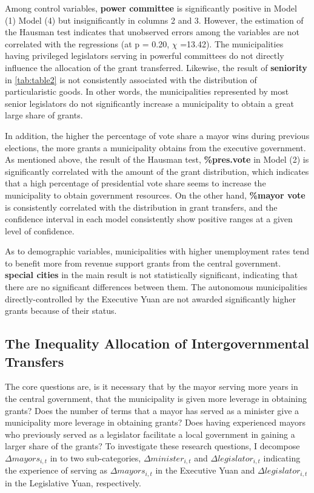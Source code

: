 

Among control variables, \textbf{power committee} is significantly positive in Model (1) Model (4) but insignificantly in columns 2 and 3. However, the estimation of the Hausman test indicates that unobserved errors among the variables are not correlated with the regressions (at p = 0.20, $\chi$ =13.42). The municipalities having privileged legislators serving in powerful committees do not directly influence the allocation of the grant transferred. Likewise, the result of \textbf{seniority} in \autoref{tab:table2} is not consistently associated with the distribution of particularistic goods. In other words, the municipalities represented by most senior legislators do not significantly increase a municipality to obtain a great large share of grants.

In addition, the higher the percentage of vote share a mayor wins during previous elections, the more grants a municipality obtains from the executive government. As mentioned above, the result of the Hausman test, \textbf{\%pres.vote} in Model (2) is significantly correlated with the amount of the grant distribution, which indicates that a high percentage of presidential vote share seems to increase the municipality to obtain government resources. On the other hand, \textbf{\%mayor vote} is consistently correlated with the distribution in grant transfers, and the confidence interval in each model consistently show positive ranges at a given level of confidence.

As to demographic variables, municipalities with higher unemployment rates tend to benefit more from revenue support grants from the central government. \textbf{special cities} in the main result is not statistically significant, indicating that there are no significant differences between them. The autonomous municipalities directly-controlled by the Executive Yuan are not awarded significantly higher grants because of their status. 

\subsection*{The Inequality Allocation of Intergovernmental Transfers}

The core questions are, is it necessary that by the mayor serving more years  in the central government, that the municipality is given more leverage in obtaining grants? Does the number of terms that a mayor has served as a minister give a municipality more leverage in obtaining grants? Does having experienced mayors who previously served as a legislator facilitate a local government in gaining a larger share of the grants? To investigate these research questions, I decompose $\Delta mayors_{i,t}$ in to two sub-categories, $\Delta minister_{i,t}$ and $\Delta legislator_{i,t}$ indicating the experience of serving as $\Delta mayors_{i,t}$ in the Executive Yuan and $\Delta legislator_{i,t}$ in the Legislative Yuan, respectively. 

